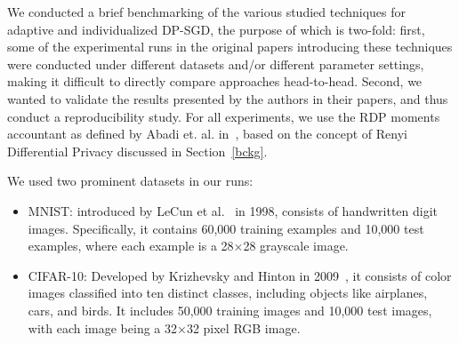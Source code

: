 We conducted a brief benchmarking of the various studied techniques for adaptive and individualized DP-SGD, the purpose of which is two-fold: first, some of the experimental runs in the original papers introducing these techniques were conducted under different datasets and/or different parameter settings, making it difficult to directly compare approaches head-to-head. Second, we wanted to validate the results presented by the authors in their papers, and thus conduct a reproducibility study. 
For all experiments, we use the RDP moments accountant as defined by Abadi et. al. in~\cite{RefWorks:RefID:40-abadi2016deep}, based on the concept of Renyi Differential Privacy discussed in Section~\ref{bckg}.

We used two prominent datasets in our runs:
\begin{itemize}
    \item MNIST: introduced by LeCun et al.~ \cite{mnist} in 1998, consists of handwritten digit images. Specifically, it contains 60,000 training examples and 10,000 test examples, where each example is a 28×28 grayscale image.
    \item CIFAR-10: Developed by Krizhevsky and Hinton in 2009~\cite{cifar}, it consists of color images classified into ten distinct classes, including objects like airplanes, cars, and birds. It includes 50,000 training images and 10,000 test images, with each image being a 32×32 pixel RGB image.
\end{itemize}

